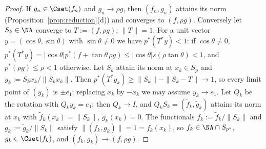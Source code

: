 \begin{proof}
If $g_n\in\Cset(f_n)$ and $g_n\to\rho g$, then $(f_n,g_n)$ attains its norm
(Proposition~\ref{prop:reduction}(d)) and converges to $(f,\rho g)$.
Conversely let $S_k\in\NA$ converge to $T:=(f,\rho g)$; $\|T\|=1$.  For a
unit vector $y=(\cos\theta,\sin\theta)$ with $\sin\theta\ne0$ we have
$p^*(T^*y)<1$: if $\cos\theta\ne0$,
$p^*(T^*y)=|\cos\theta|p^*(f+\tan\theta\,\rho g)\le|\cos\theta|s(\rho
\tan\theta)<1$, and $p^*(\rho g)\le\rho<1$ otherwise.  Let $S_k$ attain its
norm at $x_k\in S_p$ and $y_k:=S_kx_k/\|S_kx_k\|$.  Then
$p^*(T^*y_k)\ge\|S_k\|-\|S_k-T\|\to1$, so every limit point of $(y_k)$ is
$\pm e_1$; replacing $x_k$ by $-x_k$ we may assume $y_k\to e_1$.  Let $Q_k$
be the rotation with $Q_ky_k=e_1$; then $Q_k\to I$, and $Q_kS_k=(\tilde
f_k,\tilde g_k)$ attains its norm at $x_k$ with $\tilde
f_k(x_k)=\|S_k\|$, $\tilde g_k(x_k)=0$.  The functionals
$f_k:=\tilde f_k/\|S_k\|$ and $g_k:=\tilde g_k/\|S_k\|$ satisfy
$\|(f_k,g_k)\|=1=f_k(x_k)$, so $f_k\in\NA\cap S_{p^*}$, $g_k\in\Cset(f_k)$,
and $(f_k,g_k)\to(f,\rho g)$.
\end{proof}


